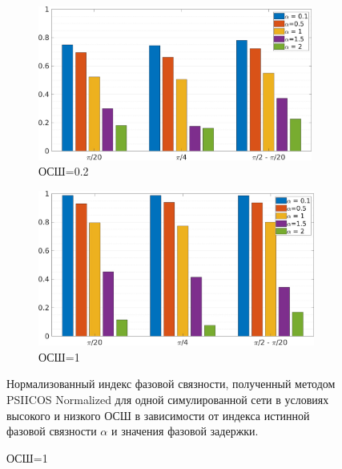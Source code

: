 \documentclass[12pt]{beamer}
\begin{document}
\begin{frame}[t]
    
\begin{figure}[htbp]
    \begin{subfigure}[t]{0.49\textwidth}
        \includegraphics[width=0.99\textwidth]{../images/bars_snr_02.jpg}
        \caption{ОСШ=0.2}\label{fig:bars_a}
    \end{subfigure}
    \begin{subfigure}[t]{0.49\textwidth}
        \includegraphics[width=0.99\linewidth]{../images/bars_snr_1.jpg}
        \caption{ОСШ=1}\label{fig:bars_b}
    \end{subfigure}
    {\footnotesize Нормализованный индекс фазовой связности, полученный методом
    PSIICOS Normalized для одной симулированной сети в условиях высокого и низкого ОСШ
    в зависимости от индекса истинной фазовой связности $\alpha$ и значения
    фазовой задержки.}
\end{figure}

\end{frame}
\end{document}
